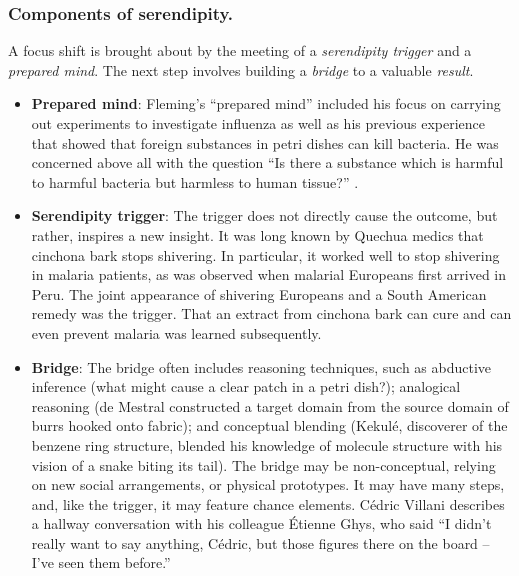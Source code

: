 \subsubsection{Components of serendipity.}

A focus shift is brought about by the meeting of a \emph{serendipity trigger} and a \emph{prepared mind}.  The next step involves building a \emph{bridge} to a valuable \emph{result}.

\begin{itemize}
\item \textbf{Prepared mind}: 
Fleming's ``prepared mind'' included his focus
on carrying out experiments to investigate influenza as well as his
previous experience that showed that foreign substances in petri dishes can kill
bacteria.  He was concerned above all with the question ``Is there a
substance which is harmful to harmful bacteria but harmless to human
tissue?''  \cite[p. 161]{roberts}.
\end{itemize}

\begin{itemize}
\item \textbf{Serendipity trigger}: The trigger does not directly
  cause the outcome, but rather, inspires a new insight.  It was long
  known by Quechua medics that cinchona bark stops shivering.  In
  particular, it worked well to stop shivering in malaria patients, as
  was observed when malarial Europeans first arrived in Peru.  The
  joint appearance of shivering Europeans and a South American remedy
  was the trigger.  That an extract from cinchona bark can cure and
  can even prevent malaria was learned subsequently.
\end{itemize}

\begin{itemize}
\item \textbf{Bridge}: The bridge often includes reasoning techniques,
  such as abductive inference (what might cause a clear patch in a
  petri dish?); analogical reasoning (de Mestral constructed a target
  domain from the source domain of burrs hooked onto fabric); and
  conceptual blending (Kekul\'e, discoverer of the benzene ring
  structure, blended his knowledge of molecule structure with his
  vision of a snake biting its tail).  The bridge may be
  non-conceptual, relying on new social arrangements, or physical
  prototypes.  It may have many steps, and, like the trigger, it may
  feature chance elements.  C\'edric Villani
  \citeyear[p.~16]{birth-of-a-theorem} describes a hallway
  conversation with his colleague \'Etienne Ghys, who said ``I didn't
  really want to say anything, C\'edric, but those figures there on
  the board -- I've seen them before.''
\end{itemize}

